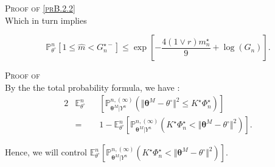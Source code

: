 \begin{pro}{\textsc{Proof of \textsc{\cref{prB.2.2}}} \\}
Which in turn implies

\[\mathds{P}_{\theta^{\circ}}^{n}\left[1 \leq \widehat{m} < G_{n}^{\star-}\right] \leq \exp\left[ - \frac{4 \left(1 \vee r\right) m_{n}^{\star}}{9} + \log\left(G_{n}\right)\right].\]
\end{pro}

\begin{pro}{\textsc{Proof of } \\}\label{proB.2.3}
By the the total probability formula, we have :
\begin{alignat*}{2}
& \mathds{E}_{\theta^{\circ}}^{n}&&\left[\mathds{P}_{\boldsymbol{\theta}^{M}\vert Y^{n}}^{n, (\infty)}\left(\Vert \boldsymbol{\theta}^{M} - \theta^{\circ} \Vert ^{2} \leq K^{\star} \Phi_{n}^{\star}\right)\right]\\
& = && 1 - \mathds{E}_{\theta^{\circ}}^{n}\left[\mathds{P}_{\boldsymbol{\theta}^{M}\vert Y^{n}}^{n, (\infty)}\left(K^{\star} \Phi_{n}^{\star} < \Vert \boldsymbol{\theta}^{M} - \theta^{\circ} \Vert^{2}\right)\right].
\end{alignat*}

Hence, we will control $\mathds{E}_{\theta^{\circ}}^{n}\left[\mathds{P}_{\boldsymbol{\theta}^{M}\vert Y^{n}}^{n, (\infty)}\left(K^{\star} \Phi_{n}^{\star} < \Vert \boldsymbol{\theta}^{M} - \theta^{\circ} \Vert ^{2}\right)\right]$.


\end{pro}

